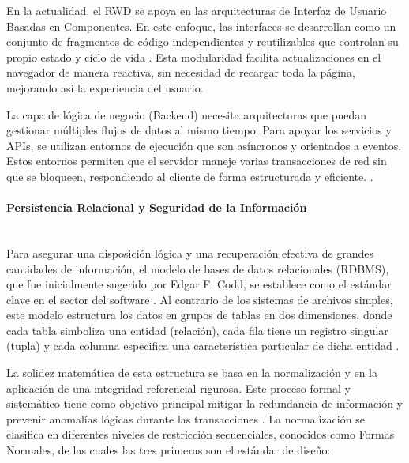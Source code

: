 En la actualidad, el RWD se apoya en las arquitecturas de Interfaz de Usuario Basadas en Componentes. En este enfoque, las interfaces se desarrollan como un conjunto de fragmentos de código independientes y reutilizables que controlan su propio estado y ciclo de vida \cite{arquitectura_componentes_2021}. Esta modularidad facilita actualizaciones en el navegador de manera reactiva, sin necesidad de recargar toda la página, mejorando así la experiencia del usuario.

La capa de lógica de negocio (Backend) necesita arquitecturas que puedan gestionar múltiples flujos de datos al mismo tiempo. Para apoyar los servicios y APIs, se utilizan entornos de ejecución que son asíncronos y orientados a eventos. Estos entornos permiten que el servidor maneje varias transacciones de red sin que se bloqueen, respondiendo al cliente de forma estructurada y eficiente. \cite{backend_asincrono_2022}.

\paragraph{Persistencia Relacional y Seguridad de la Información} \leavevmode \\

Para asegurar una disposición lógica y una recuperación efectiva de grandes cantidades de información, el modelo de bases de datos relacionales (RDBMS), que fue inicialmente sugerido por Edgar F. Codd, se establece como el estándar clave en el sector del software \cite{Codd1970}. Al contrario de los sistemas de archivos simples, este modelo estructura los datos en grupos de tablas en dos dimensiones, donde cada tabla simboliza una entidad (relación), cada fila tiene un registro singular (tupla) y cada columna especifica una característica particular de dicha entidad \cite{Codd1970}.

La solidez matemática de esta estructura se basa en la normalización y en la aplicación de una integridad referencial rigurosa. Este proceso formal y sistemático tiene como objetivo principal mitigar la redundancia de información y prevenir anomalías lógicas durante las transacciones \cite{silberschatz2014fundamentos}. La normalización se clasifica en diferentes niveles de restricción secuenciales, conocidos como Formas Normales, de las cuales las tres primeras son el estándar de diseño:

